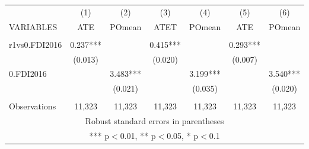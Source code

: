 \documentclass[]{article}
\begin{document}
\begin{tabular}{lcccccc} \hline
 & (1) & (2) & (3) & (4) & (5) & (6) \\
VARIABLES & ATE & POmean & ATET & POmean & ATE & POmean \\ \hline
 &  &  &  &  &  &  \\
r1vs0.FDI2016 & 0.237*** &  & 0.415*** &  & 0.293*** &  \\
 & (0.013) &  & (0.020) &  & (0.007) &  \\
0.FDI2016 &  & 3.483*** &  & 3.199*** &  & 3.540*** \\
 &  & (0.021) &  & (0.035) &  & (0.020) \\
 &  &  &  &  &  &  \\
 Observations & 11,323 & 11,323 & 11,323 & 11,323 & 11,323 & 11,323 \\ \hline
\multicolumn{7}{c}{ Robust standard errors in parentheses} \\
\multicolumn{7}{c}{ *** p$<$0.01, ** p$<$0.05, * p$<$0.1} \\
\end{tabular}
\end{document}
